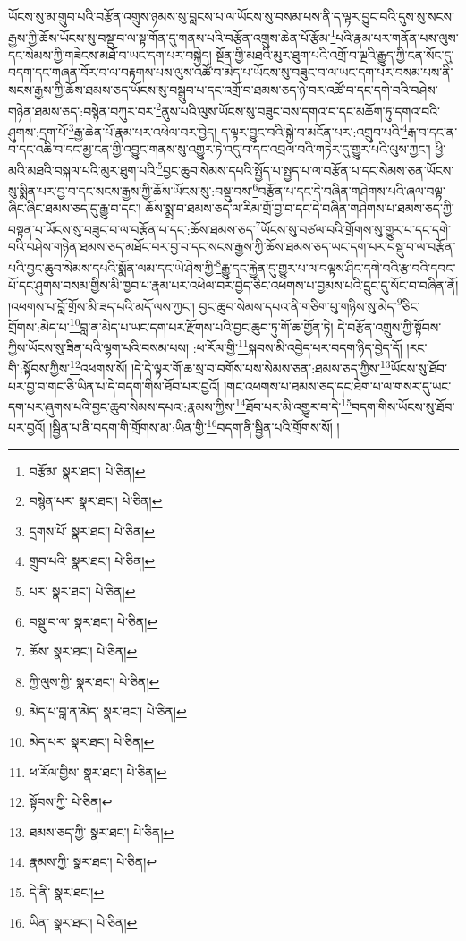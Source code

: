 ཡོངས་སུ་མ་གྲུབ་པའི་བརྩོན་འགྲུས་ཉམས་སུ་བླངས་པ་ལ་ཡོངས་སུ་བསམ་པས་ནི་ད་ལྟར་བྱུང་བའི་དུས་སུ་སངས་རྒྱས་ཀྱི་ཆོས་ཡོངས་སུ་བསྡུ་བ་ལ་སྟ་གོན་དུ་གནས་པའི་བརྩོན་འགྲུས་ཆེན་པོ་རྩོམ་\footnote{བརྩོམ་  སྣར་ཐང་།  པེ་ཅིན། }པའི་རྣམ་པར་གནོན་པས་ལུས་དང་སེམས་ཀྱི་གཟེངས་མཐོ་བ་ཡང་དག་པར་བསྐྱེད། སྔོན་གྱི་མཐའི་མུར་ཐུག་པའི་འགྲོ་བ་ལྔའི་རྒྱུད་ཀྱི་ངན་སོང་དུ་བདག་དང་གཞན་བོར་བ་ལ་བརྟགས་པས་ལུས་འཚོ་བ་མེད་པ་ཡོངས་སུ་བཟུང་བ་ལ་ཡང་དག་པར་བསམ་པས་ནི་སངས་རྒྱས་ཀྱི་ཆོས་ཐམས་ཅད་ཡོངས་སུ་བསྒྲུབ་པ་དང་འགྲོ་བ་ཐམས་ཅད་ཉེ་བར་འཚོ་བ་དང་དགེ་བའི་བཤེས་གཉེན་ཐམས་ཅད་:བསྙེན་བཀུར་བར་\footnote{བསྙེན་པར་  སྣར་ཐང་།  པེ་ཅིན། }ནུས་པའི་ལུས་ཡོངས་སུ་བཟུང་བས་དགའ་བ་དང་མཆོག་ཏུ་དགའ་བའི་ཤུགས་:དྲག་པོ་\footnote{དྲགས་པོ་  སྣར་ཐང་།  པེ་ཅིན། }རྒྱ་ཆེན་པོ་རྣམ་པར་འཕེལ་བར་བྱེད། ད་ལྟར་བྱུང་བའི་སྐྱེ་བ་མངོན་པར་:འགྲུབ་པའི་\footnote{གྲུབ་པའི་  སྣར་ཐང་།  པེ་ཅིན། }རྒ་བ་དང་ན་བ་དང་འཆི་བ་དང་མྱ་ངན་གྱི་འབྱུང་གནས་སུ་འགྱུར་ཏེ་འདུ་བ་དང་འབྲལ་བའི་གཏེར་དུ་གྱུར་པའི་ལུས་ཀྱང་། ཕྱི་མའི་མཐའི་བསྐལ་པའི་མུར་ཐུག་པའི་\footnote{པར་  སྣར་ཐང་།  པེ་ཅིན། }བྱང་ཆུབ་སེམས་དཔའི་སྤྱོད་པ་སྤྱད་པ་ལ་བརྩོན་པ་དང་སེམས་ཅན་ཡོངས་སུ་སྨིན་པར་བྱ་བ་དང་སངས་རྒྱས་ཀྱི་ཆོས་ཡོངས་སུ་:བསྡུ་བས་\footnote{བསྡུ་བ་ལ་  སྣར་ཐང་།  པེ་ཅིན། }བརྩོན་པ་དང་དེ་བཞིན་གཤེགས་པའི་ཞལ་བལྟ་ཞིང་ཞིང་ཐམས་ཅད་དུ་རྒྱུ་བ་དང་། ཆོས་སྨྲ་བ་ཐམས་ཅད་ལ་རིམ་གྲོ་བྱ་བ་དང་དེ་བཞིན་གཤེགས་པ་ཐམས་ཅད་ཀྱི་བསྟན་པ་ཡོངས་སུ་བཟུང་བ་ལ་བརྩོན་པ་དང་:ཆོས་ཐམས་ཅད་\footnote{ཆོས་  སྣར་ཐང་།  པེ་ཅིན། }ཡོངས་སུ་བཙལ་བའི་གྲོགས་སུ་གྱུར་པ་དང་དགེ་བའི་བཤེས་གཉེན་ཐམས་ཅད་མཐོང་བར་བྱ་བ་དང་སངས་རྒྱས་ཀྱི་ཆོས་ཐམས་ཅད་ཡང་དག་པར་བསྡུ་བ་ལ་བརྩོན་པའི་བྱང་ཆུབ་སེམས་དཔའི་སྨོན་ལམ་དང་ཡེ་ཤེས་ཀྱི་\footnote{ཀྱི་ལུས་ཀྱི་  སྣར་ཐང་།  པེ་ཅིན། }རྒྱུ་དང་རྐྱེན་དུ་གྱུར་པ་ལ་བལྟས་ཤིང་དགེ་བའི་རྩ་བའི་དབང་པོ་དང་ཤུགས་བསམ་གྱིས་མི་ཁྱབ་པ་རྣམ་པར་འཕེལ་བར་བྱེད་ཅིང་འཕགས་པ་བྱམས་པའི་དྲུང་དུ་སོང་བ་བཞིན་ནོ། །འཕགས་པ་བློ་གྲོས་མི་ཟད་པའི་མདོ་ལས་ཀྱང་། བྱང་ཆུབ་སེམས་དཔའ་ནི་གཅིག་པུ་གཉིས་སུ་མེད་\footnote{མེད་པ་བླ་ན་མེད་  སྣར་ཐང་།  པེ་ཅིན། }ཅིང་གྲོགས་:མེད་པ་\footnote{མེད་པར་  སྣར་ཐང་།  པེ་ཅིན། }བླ་ན་མེད་པ་ཡང་དག་པར་རྫོགས་པའི་བྱང་ཆུབ་ཏུ་གོ་ཆ་གྱོན་ཏེ། དེ་བརྩོན་འགྲུས་ཀྱི་སྟོབས་ཀྱིས་ཡོངས་སུ་ཟིན་པའི་ལྷག་པའི་བསམ་པས། :ཕ་རོལ་གྱི་\footnote{ཕ་རོལ་གྱིས་  སྣར་ཐང་།  པེ་ཅིན། }སྐབས་མི་འབྱེད་པར་བདག་ཉིད་བྱེད་དོ། །རང་གི་:སྟོབས་ཀྱིས་\footnote{སྟོབས་ཀྱི་  པེ་ཅིན། }འཕགས་སོ། །དེ་དེ་ལྟར་གོ་ཆ་སྲ་བ་བགོས་པས་སེམས་ཅན་:ཐམས་ཅད་ཀྱིས་\footnote{ཐམས་ཅད་ཀྱི་  སྣར་ཐང་།  པེ་ཅིན། }ཡོངས་སུ་ཐོབ་པར་བྱ་བ་གང་ཅི་ཡིན་པ་དེ་བདག་གིས་ཐོབ་པར་བྱའོ། །གང་འཕགས་པ་ཐམས་ཅད་དང་ཐེག་པ་ལ་གསར་དུ་ཡང་དག་པར་ཞུགས་པའི་བྱང་ཆུབ་སེམས་དཔའ་:རྣམས་ཀྱིས་\footnote{རྣམས་ཀྱི་  སྣར་ཐང་།  པེ་ཅིན། }ཐོབ་པར་མི་འགྱུར་བ་དེ་\footnote{དེ་ནི་  སྣར་ཐང་། }བདག་གིས་ཡོངས་སུ་ཐོབ་པར་བྱའོ། །སྦྱིན་པ་ནི་བདག་གི་གྲོགས་མ་:ཡིན་གྱི་\footnote{ཡིན་  སྣར་ཐང་།  པེ་ཅིན། }བདག་ནི་སྦྱིན་པའི་གྲོགས་སོ། །
